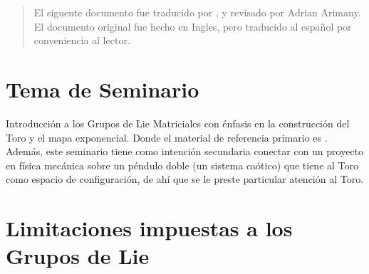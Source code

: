 \begin{assignment}[
  header=HeaderA,
  body=BodyA,
  title={Guia de Seminario Algebra Moderna},
  duedate={\today},
  toc=false,
  toctitle={},
  exlist=false
]

\begin{quote}
    El siguente documento fue traducido por \textcite{claude2025}, y revisado por Adrian Arimany. El documento original fue hecho en Ingles, pero traducido al español por conveniencia al lector.
\end{quote}

\section*{Tema de Seminario}
Introducción a los Grupos de Lie Matriciales con énfasis en la construcción del Toro y el mapa exponencial. Donde el material de referencia primario es \textcite{hall2015lie}. Además, este seminario tiene como intención secundaria conectar con un proyecto en física mecánica sobre un péndulo doble (un sistema caótico) que tiene al Toro como espacio de configuración, de ahí que se le preste particular atención al Toro.

\section*{Limitaciones impuestas a los Grupos de Lie}


\end{assignment}
